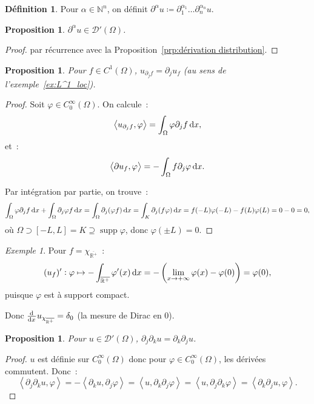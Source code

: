 \documentclass{report}
\DeclareMathOperator{\supp}{supp}
\newcommand{\R}{{\mathbb R}}
\newcommand{\N}{{\mathbb N}}
\newcommand{\scpr}[2]{\left\langle#1, #2\right\rangle}
\newcommand{\pinfty}{{+\infty}}
\newtheorem{prp}[thm]{Proposition}
\theoremstyle{definition}
\newtheorem{déf}[thm]{Définition}
\theoremstyle{remark}
\newtheorem{ex}{Exemple}[chapter]
\begin{document}
\begin{déf} Pour $\alpha \in \N^n$, on définit $\partial^\alpha u \coloneqq \partial_1^{\alpha_1}\ldots\partial_n^{\alpha_n}u$.
\end{déf}

\begin{prp} $\partial^\alpha u \in \mathcal D'(\Omega)$.
\end{prp}

\begin{proof} par récurrence avec la Proposition~\ref{prp:dérivation distribution}.
\end{proof}

\begin{prp} Pour $f \in C^1(\Omega)$, $u_{\partial_jf} = \partial_ju_f$ (au sens de l'exemple~\ref{ex:L^1_loc}).
\end{prp}

\begin{proof} Soit $\varphi \in C^\infty_0(\Omega)$. On calcule~:
\[\scpr {u_{\partial_jf}}\varphi = \int_\Omega \varphi\partial_jf\dif x,\]
et~:
\[\scpr {\partial u_f}\varphi = -\int_\Omega f\partial_j\varphi\dif x.\]

Par intégration par partie, on trouve~:
\[\int_\Omega\varphi\partial_jf\dif x + \int_\Omega\partial_j\varphi f\dif x = \int_\Omega \partial_j(\varphi f)\dif x = \int_K \partial_j(f\varphi)\dif x
= f(-L)\varphi(-L) - f(L)\varphi(L) = 0-0 = 0,\]
où $\Omega \supset [-L, L] = K \supseteq \supp \varphi$, donc $\varphi(\pm L) = 0$.
\end{proof}

\begin{ex} Pour $f = \chi_{\overline {\R^+}}$~:
\[(u_f)' : \varphi \mapsto -\int_{\overline {\R^+}}\varphi'(x)\dif x = -\left(\lim_{x \to \pinfty}\varphi(x) - \varphi(0)\right) = \varphi(0),\]
puisque $\varphi$ est à support compact.

Donc $\od {}xu_{\chi_{\overline {\R^+}}} = \delta_0$ (la mesure de Dirac en 0).
\end{ex}

\begin{prp} Pour $u \in \mathcal D'(\Omega)$, $\partial_j\partial_ku = \partial_k\partial_ju$.
\end{prp}

\begin{proof} $u$ est définie sur $C^\infty_0(\Omega)$ donc pour $\varphi \in C^\infty_0(\Omega)$, les dérivées commutent. Donc~:
\[\scpr {\partial_j\partial_ku}\varphi = -\scpr {\partial_ku}{\partial_j\varphi} = \scpr u{\partial_k\partial_j\varphi} = \scpr u{\partial_j\partial_k\varphi}
= \scpr {\partial_k\partial_ju}\varphi.\]
\end{proof}
\end{document}
